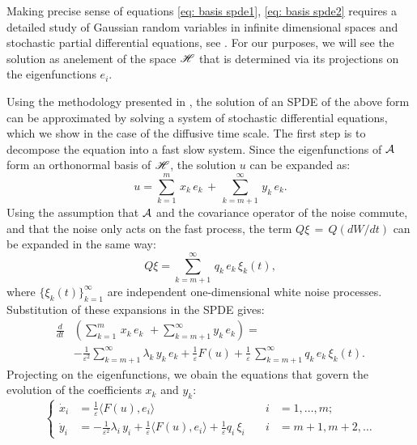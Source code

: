 Making precise sense of equations \eqref{eq: basis spde1}, \eqref{eq: basis spde2} requires a detailed study
of Gaussian random variables in infinite dimensional spaces and stochastic
partial differential equations, see
\citep{da2008stochastic,hairer2009introduction}. For our purposes, we will see the
solution as anelement of the space $\mathscr H$ that is determined via its projections on the
eigenfunctions $e_i$. 

Using the methodology presented in \cite{abdulle2012numerical}, the solution of an SPDE
of the above form can be approximated by solving a system of stochastic
differential equations, which we show in the case of the diffusive time scale.
The first step is to decompose the equation into a fast slow system. Since the
eigenfunctions of $\mathcal A$ form an orthonormal basis of $\mathscr H$, the solution
$u$ can be expanded as: 
\begin{equation*} 
    u = \sum_{k=1}^{m} \,x_{k}\,e_{k} \,+\,\sum_{k=m+1}^{\infty} \,y_{k}\,e_{k}.  
\end{equation*}
Using the assumption that $\mathcal A$ and the covariance
operator of the noise commute, and that the noise only acts on the fast
process, the term $Q{\xi}\,=\,Q (dW/dt)$ can be expanded in the same way: 
\begin{equation*} 
    Q{\xi}= \sum_{k=m+1}^{\infty}\,q_{k}\,e_{k}\,{\xi}_{k}(t),
\end{equation*} 
where $\{\xi_{k}(t) \}_{k=1}^{\infty}$ are independent one-dimensional white
noise processes. Substitution of these expansions in the SPDE gives: 
\begin{equation*}
    \begin{aligned} 
        \frac d{dt} & \left(\sum_{k=1}^{m}\,x_{k}\,e_{k}\,\,+\sum_{k=m+1}^{\infty}
            y_{k}\,e_{k} \right) = \\ & -\frac 1{\varepsilon^{2}}\sum_{k=m+1}^{\infty}
        \lambda_{k}\,y_{k}\,e_{k} + \frac 1 \varepsilon F(u) + \frac 1 \varepsilon\,
        \sum_{k=m+1}^{\infty}q_{k}\,e_{k}\,\xi_{k}(t).  
    \end{aligned} 
\end{equation*}
Projecting on the eigenfunctions, we obain the equations that govern
the evolution of the coefficients $x_k$ and $y_k$:
\begin{equation*} 
    \left\{\begin{aligned}
            \dot x_{i} &= \frac 1 \varepsilon\langle F(u), e_{i}\rangle & \quad i & = 1,\dots,
            m;\\ \dot y_{i} &= -\frac 1 {\varepsilon^{2}} {\lambda}_{i}\,y_{i} + \frac 1\varepsilon\langle
            F(u), e_{i}\rangle +\frac 1\varepsilon q_{i}\,\xi_{i} & \quad i &= m+1,m+2, \dots
        \end{aligned} \right.  
\end{equation*} 
